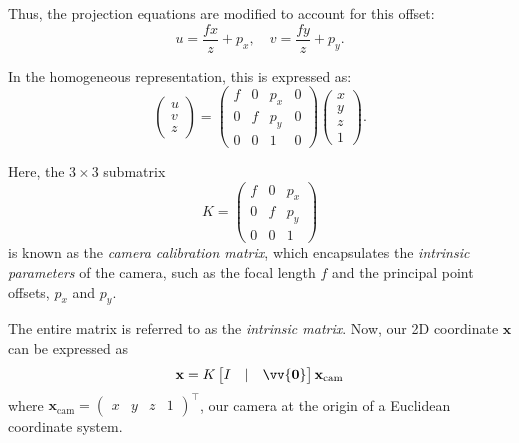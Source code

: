 \documentclass[12pt]{article}
\newcommand{\vect}[1]{\vv{\mathbf{#1}}}
\begin{document}
Thus, the projection equations are modified to account for this offset:
$$
u = \frac{f x}{z} + p_x, \quad v = \frac{f y}{z} + p_y.
$$

In the homogeneous representation, this is expressed as:
$$
\begin{pmatrix} u \\ v \\ z \end{pmatrix} = 
\begin{pmatrix}
f & 0 & p_x & 0 \\
0 & f & p_y & 0 \\
0 & 0 & 1 & 0
\end{pmatrix}
\begin{pmatrix} x \\ y \\ z \\ 1 \end{pmatrix}.
$$

Here, the $3 \times 3$ submatrix
$$
K = \begin{pmatrix}
f & 0 & p_x \\
0 & f & p_y \\
0 & 0 & 1
\end{pmatrix}
$$
is known as the \textit{camera calibration matrix}, which encapsulates the \textit{intrinsic parameters} of the camera, such as the focal length $f$ and the principal point offsets, $p_x$ and $p_y$.

The entire matrix is referred to as the \textit{intrinsic matrix}. Now, our 2D coordinate  $\mathbf{x}$ can be expressed as
$$
\mathbf{x} = K\begin{bmatrix}
    I & | & \vect{0}
\end{bmatrix}\mathbf{x}_\text{cam}
$$
where $\mathbf{x}_\text{cam}=\begin{pmatrix}
    x & y & z & 1
\end{pmatrix}^\top$, our camera at the origin of a Euclidean coordinate system.
\end{document}
